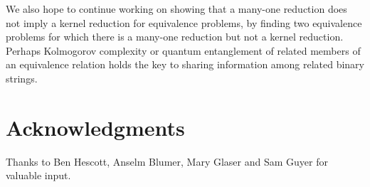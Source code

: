 \documentclass{article}
\theoremstyle{definition} \newtheorem{definition}[definition]{Definition}
\begin{document}
We also hope to continue working on showing that a many-one reduction does not
imply a kernel reduction for equivalence problems, by finding two equivalence
problems for which there is a many-one reduction but not a kernel
reduction. Perhaps Kolmogorov complexity or quantum entanglement of related
members of an equivalence relation holds the key to sharing information among
related binary strings.

\section{Acknowledgments}

Thanks to Ben Hescott, Anselm Blumer, Mary Glaser and Sam Guyer for valuable
input.

 
\end{document}
